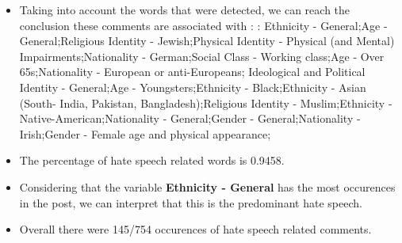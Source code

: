 \documentclass[11pt]{article}
\begin{document}
\begin{itemize}\item Taking into account the words that were detected, we can reach the conclusion these comments are associated with : : Ethnicity - General;Age - General;Religious Identity - Jewish;Physical Identity - Physical (and Mental) Impairments;Nationality - German;Social Class - Working class;Age - Over 65s;Nationality - European or anti-Europeans; Ideological and Political Identity - General;Age - Youngsters;Ethnicity - Black;Ethnicity - Asian (South- India, Pakistan, Bangladesh);Religious Identity - Muslim;Ethnicity - Native-American;Nationality - General;Gender - General;Nationality - Irish;Gender - Female age and physical appearance;%

\item The percentage of hate speech related words is 0.9458.

\item Considering that the variable \textbf{Ethnicity - General} has the most occurences in the post, we can interpret that this is the predominant hate speech.

\item Overall there were 145/754 occurences of hate speech related comments.\end{itemize}
\end{document}
